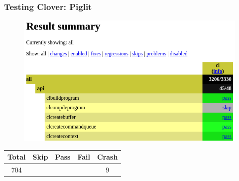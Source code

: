 \documentclass{smilebeamer}
\begin{document}

\begin{frame}
\frametitle{Testing Clover: Piglit}
\begin{figure}
\includegraphics[width=0.9\linewidth]{img/html_output.png}
\end{figure}
\centering
\begin{tabular}{c|c|c|c|c}
Total & Skip & Pass & Fail & Crash \\
\hline
704 & \color{blue}{94} & \color{green}{541} & \color{red}{60} & 9
\end{tabular}
\end{frame}
\end{document}
